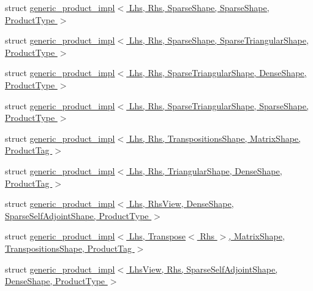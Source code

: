 \begin{DoxyCompactItemize}
\item 
struct \hyperlink{struct_eigen_1_1internal_1_1generic__product__impl_3_01_lhs_00_01_rhs_00_01_sparse_shape_00_01_s0f15bf86456099378e4a76f37323e721}{generic\+\_\+product\+\_\+impl$<$ Lhs, Rhs, Sparse\+Shape, Sparse\+Shape, Product\+Type $>$}
\item 
struct \hyperlink{struct_eigen_1_1internal_1_1generic__product__impl_3_01_lhs_00_01_rhs_00_01_sparse_shape_00_01_s05ccb218a557b35cabc12ad35cb16218}{generic\+\_\+product\+\_\+impl$<$ Lhs, Rhs, Sparse\+Shape, Sparse\+Triangular\+Shape, Product\+Type $>$}
\item 
struct \hyperlink{struct_eigen_1_1internal_1_1generic__product__impl_3_01_lhs_00_01_rhs_00_01_sparse_triangular_she6f06f29bc806fe3ce6ddd06da00c291}{generic\+\_\+product\+\_\+impl$<$ Lhs, Rhs, Sparse\+Triangular\+Shape, Dense\+Shape, Product\+Type $>$}
\item 
struct \hyperlink{struct_eigen_1_1internal_1_1generic__product__impl_3_01_lhs_00_01_rhs_00_01_sparse_triangular_sh3486abfb0e2b8914c411a6ff792a44dd}{generic\+\_\+product\+\_\+impl$<$ Lhs, Rhs, Sparse\+Triangular\+Shape, Sparse\+Shape, Product\+Type $>$}
\item 
struct \hyperlink{struct_eigen_1_1internal_1_1generic__product__impl_3_01_lhs_00_01_rhs_00_01_transpositions_shapea83c7854330208d83886265b658a092d}{generic\+\_\+product\+\_\+impl$<$ Lhs, Rhs, Transpositions\+Shape, Matrix\+Shape, Product\+Tag $>$}
\item 
struct \hyperlink{struct_eigen_1_1internal_1_1generic__product__impl_3_01_lhs_00_01_rhs_00_01_triangular_shape_00_4d5779e6000f2bc51bed3ea9b35ea4da}{generic\+\_\+product\+\_\+impl$<$ Lhs, Rhs, Triangular\+Shape, Dense\+Shape, Product\+Tag $>$}
\item 
struct \hyperlink{struct_eigen_1_1internal_1_1generic__product__impl_3_01_lhs_00_01_rhs_view_00_01_dense_shape_00_97d81d328d4cc9ddd79aee8e69e68494}{generic\+\_\+product\+\_\+impl$<$ Lhs, Rhs\+View, Dense\+Shape, Sparse\+Self\+Adjoint\+Shape, Product\+Type $>$}
\item 
struct \hyperlink{struct_eigen_1_1internal_1_1generic__product__impl_3_01_lhs_00_01_transpose_3_01_rhs_01_4_00_01_7e81e525eaa34bd7c41fa1e151593e72}{generic\+\_\+product\+\_\+impl$<$ Lhs, Transpose$<$ Rhs $>$, Matrix\+Shape, Transpositions\+Shape, Product\+Tag $>$}
\item 
struct \hyperlink{struct_eigen_1_1internal_1_1generic__product__impl_3_01_lhs_view_00_01_rhs_00_01_sparse_self_adj0d7cb22d06770c150f0f74fa6f4e5968}{generic\+\_\+product\+\_\+impl$<$ Lhs\+View, Rhs, Sparse\+Self\+Adjoint\+Shape, Dense\+Shape, Product\+Type $>$}

\end{DoxyCompactItemize}
